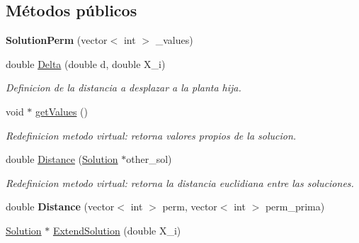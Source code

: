 \subsection*{Métodos públicos}
\begin{DoxyCompactItemize}
\item 
\hypertarget{class_solution_perm_a71ea7ad7c43c4b9ce6058640acd24bae}{{\bfseries Solution\+Perm} (vector$<$ int $>$ \+\_\+values)}\label{class_solution_perm_a71ea7ad7c43c4b9ce6058640acd24bae}

\item 
\hypertarget{class_solution_perm_a19e9bfc6873053fa4cb2644fb0ceadba}{double \hyperlink{class_solution_perm_a19e9bfc6873053fa4cb2644fb0ceadba}{Delta} (double d, double X\+\_\+i)}\label{class_solution_perm_a19e9bfc6873053fa4cb2644fb0ceadba}

\begin{DoxyCompactList}\small\item\em Definicion de la distancia a desplazar a la planta hija. \end{DoxyCompactList}\item 
\hypertarget{class_solution_perm_a087dca9092baa1bfe8d52270f3e927a5}{void $\ast$ \hyperlink{class_solution_perm_a087dca9092baa1bfe8d52270f3e927a5}{get\+Values} ()}\label{class_solution_perm_a087dca9092baa1bfe8d52270f3e927a5}

\begin{DoxyCompactList}\small\item\em Redefinicion metodo virtual\+: retorna valores propios de la solucion. \end{DoxyCompactList}\item 
\hypertarget{class_solution_perm_a8cdccc3689d67ddb773a5384bb0be7f1}{double \hyperlink{class_solution_perm_a8cdccc3689d67ddb773a5384bb0be7f1}{Distance} (\hyperlink{class_solution}{Solution} $\ast$other\+\_\+sol)}\label{class_solution_perm_a8cdccc3689d67ddb773a5384bb0be7f1}

\begin{DoxyCompactList}\small\item\em Redefinicion metodo virtual\+: retorna la distancia euclidiana entre las soluciones. \end{DoxyCompactList}\item 
\hypertarget{class_solution_perm_aef2c6326c6a9d77b0e33ed9c024dc2e1}{double {\bfseries Distance} (vector$<$ int $>$ perm, vector$<$ int $>$ perm\+\_\+prima)}\label{class_solution_perm_aef2c6326c6a9d77b0e33ed9c024dc2e1}

\item 
\hypertarget{class_solution_perm_ae2d233dbbd83af831e7fe0fde16906ff}{\hyperlink{class_solution}{Solution} $\ast$ \hyperlink{class_solution_perm_ae2d233dbbd83af831e7fe0fde16906ff}{Extend\+Solution} (double X\+\_\+i)}\label{class_solution_perm_ae2d233dbbd83af831e7fe0fde16906ff}


\end{DoxyCompactItemize}
